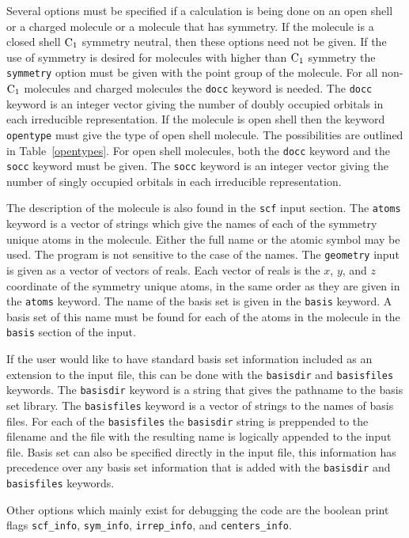 Several options must be specified if a calculation is being done on
an open shell or a charged molecule or a molecule that has symmetry.
If the molecule
is a closed shell ${\rm C}_1$ symmetry neutral, then these options
need not be given.  If the use of symmetry is desired for molecules
with higher than ${\rm C}_1$ symmetry the {\tt symmetry}
option must be given with the point group of the molecule.  For all
non-${\rm C}_1$ molecules and charged molecules the {\tt docc} keyword
is needed.  The {\tt docc} keyword is an integer vector giving the
number of doubly occupied orbitals in each irreducible representation.  If the
molecule is open shell then the keyword {\tt opentype} must give the
type of open shell molecule.  The possibilities are outlined in
Table~\ref{opentypes}.  For open shell molecules, both the {\tt docc}
keyword and the {\tt socc} keyword must be given.  The {\tt socc} keyword
is an integer vector giving the number of singly occupied orbitals
in each irreducible representation.

The description of the molecule is also found in the {\tt scf} input
section.  The {\tt atoms} keyword is a vector of strings which give
the names of each of the symmetry unique atoms in the molecule.  Either
the full name or the atomic symbol may be used.  The program is not
sensitive to the case of the names.  The {\tt geometry} input is
given as a vector of vectors of reals.  Each vector of reals is the
$x$, $y$, and $z$ coordinate of the symmetry unique atoms, in the
same order as they are given in the {\tt atoms} keyword.  The
name of the basis set is given in the {\tt basis} keyword.  A basis
set of this name must be found for each of the atoms in the molecule
in the {\tt basis} section of the input.

If the user would like to have standard basis set information included as
an extension to the input file, this can be done with the {\tt basisdir}
and {\tt basisfiles} keywords.   The {\tt basisdir} keyword is a string
that gives the pathname to the basis set library.  The {\tt basisfiles}
keyword is a vector of strings to the names of basis files.  For each
of the {\tt basisfiles} the {\tt basisdir} string is preppended to
the filename and the file with the resulting name is logically appended to
the input file.  Basis set can also be specified directly in the
input file, this information has precedence over any basis set
information that is added with the {\tt basisdir} and {\tt basisfiles}
keywords.

Other options which mainly exist for debugging the code are the boolean
print flags {\tt scf\_info}, {\tt sym\_info}, {\tt irrep\_info}, and
{\tt centers\_info}.

